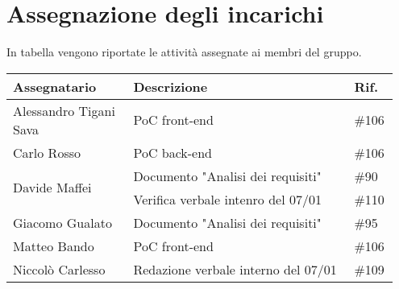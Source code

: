\section{Assegnazione degli incarichi}
In tabella vengono riportate le attività assegnate ai membri del gruppo.
\begin{center}
	{
		\renewcommand{\arraystretch}{1.5}
		\begin{tabular}{p{0.30\linewidth}|p{0.55\linewidth}|p{0.10\linewidth}}
			\textbf{Assegnatario}             	& \textbf{Descrizione}							& \textbf{Rif.} \\
			\hline
			Alessandro Tigani Sava            	& PoC front-end									& \#106         \\
			\hline
			Carlo Rosso                       	& PoC back-end									& \#106         \\
			\hline
			\multirow{2}{*}{Davide Maffei}		& Documento "Analisi dei requisiti"				& \#90          \\
			\cline{2-3}
				& Verifica verbale intenro del 07/01	& \#110 \\
			\hline
			Giacomo Gualato						& Documento "Analisi dei requisiti"				& \#95          \\
			\hline
			Matteo Bando     					& PoC front-end									& \#106         \\
			\hline
			Niccolò Carlesso				 	& Redazione verbale interno del 07/01			& \#109         \\
			\hline
		\end{tabular}
	}
\end{center}
